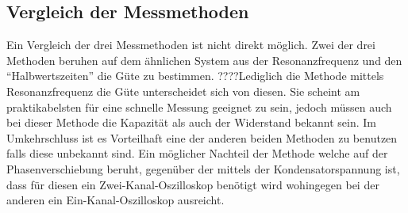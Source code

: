\subsection{Vergleich der Messmethoden}
Ein Vergleich der drei Messmethoden ist nicht direkt möglich. Zwei der drei Methoden beruhen auf dem ähnlichen System aus der Resonanzfrequenz und den ``Halbwertszeiten'' die Güte zu bestimmen. ????Lediglich die Methode mittels Resonanzfrequenz die Güte unterscheidet sich von diesen. Sie scheint am praktikabelsten für eine schnelle Messung geeignet zu sein, jedoch müssen auch bei dieser Methode die Kapazität als auch der Widerstand bekannt sein. Im Umkehrschluss ist es Vorteilhaft eine der anderen beiden Methoden zu benutzen falls diese unbekannt sind. Ein möglicher Nachteil der Methode welche auf der Phasenverschiebung beruht, gegenüber der mittels der Kondensatorspannung ist, dass für diesen ein Zwei-Kanal-Oszilloskop benötigt wird wohingegen bei der anderen ein Ein-Kanal-Oszilloskop ausreicht.
